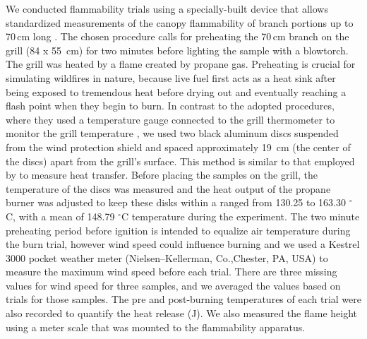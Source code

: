 \documentclass{ttuthes2007}
\begin{document}
\noindent We conducted flammability trials using a specially-built device that allows standardized measurements of the canopy flammability of branch portions up to 70\,cm long \citep{jaureguiberry2011device}. The chosen procedure calls for preheating the 70\,cm branch on the grill (84 x 55 \,cm) for two minutes before lighting the sample with a blowtorch. The grill was heated by a flame created by propane gas. Preheating is crucial for simulating wildfires in nature, because live fuel first acts as a heat sink after being exposed to tremendous heat before drying out and eventually reaching a flash point when they begin to burn. In contrast to the adopted procedures, where they used a temperature gauge connected to the grill thermometer to monitor the grill temperature \citep{jaureguiberry2011device}, we used two black aluminum discs  suspended from the wind protection shield and spaced approximately 19 \,cm (the center of the discs) apart from the grill's surface. This method is similar to that employed by \citet{gao2022burn} to measure heat transfer. Before placing the samples on the grill, the temperature of the discs was measured and the heat output of the propane burner was adjusted to keep these disks within a ranged from 130.25 to 163.30 $^{\circ}$C, with a mean of 148.79 $^{\circ}$C temperature  during the experiment. The two minute preheating period before ignition is intended to equalize air temperature during the burn trial, however wind speed could influence burning and we used
a Kestrel 3000 pocket weather meter (Nielsen–Kellerman, Co.,Chester, PA, USA) to
measure the maximum wind speed before each trial. There are three missing values for wind speed for three samples, and we averaged the values based on trials for those samples.
The pre and post-burning temperatures of each trial were also recorded to quantify the heat release (J). We also measured the flame height using a meter scale that was mounted to the flammability apparatus.

\end{document}
